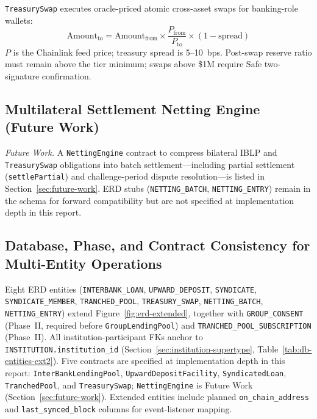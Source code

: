 \documentclass[12pt,a4paper]{report}
\begin{document}
\texttt{TreasurySwap} executes oracle-priced atomic cross-asset swaps for banking-role wallets:
\begin{equation}
\text{Amount}_{\text{to}} = \text{Amount}_{\text{from}} \times \frac{P_{\text{from}}}{P_{\text{to}}} \times (1 - \text{spread})
\end{equation}
\noindent $P$ is the Chainlink feed price; treasury spread is 5--10~bps. Post-swap reserve ratio must remain above the tier minimum; swaps above \$1M require Safe two-signature confirmation.

\subsection{Multilateral Settlement Netting Engine (Future Work)}
\label{sec:netting-settlement}

\noindent\textit{Future Work.} A \texttt{NettingEngine} contract to compress bilateral IBLP and \texttt{TreasurySwap} obligations into batch settlement---including partial settlement (\texttt{settlePartial}) and challenge-period dispute resolution---is listed in Section~\ref{sec:future-work}. ERD stubs (\texttt{NETTING\_BATCH}, \texttt{NETTING\_ENTRY}) remain in the schema for forward compatibility but are not specified at implementation depth in this report.

\subsection{Database, Phase, and Contract Consistency for Multi-Entity Operations}
\label{sec:multi-entity-consistency}

Eight ERD entities (\texttt{INTERBANK\_LOAN}, \texttt{UPWARD\_DEPOSIT}, \texttt{SYNDICATE}, \texttt{SYNDICATE\_MEMBER}, \texttt{TRANCHED\_POOL}, \texttt{TREASURY\_SWAP}, \texttt{NETTING\_BATCH}, \texttt{NETTING\_ENTRY}) extend Figure~\ref{fig:erd-extended}, together with \texttt{GROUP\_CONSENT} (Phase~II, required before \texttt{GroupLendingPool}) and \texttt{TRANCHED\_POOL\_SUBSCRIPTION} (Phase~II). All institution-participant FKs anchor to \texttt{INSTITUTION.institution\_id} (Section~\ref{sec:institution-supertype}, Table~\ref{tab:db-entities-ext2}). Five contracts are specified at implementation depth in this report: \texttt{InterBankLendingPool}, \texttt{UpwardDepositFacility}, \texttt{SyndicatedLoan}, \texttt{TranchedPool}, and \texttt{TreasurySwap}; \texttt{NettingEngine} is Future Work (Section~\ref{sec:future-work}). Extended entities include planned \texttt{on\_chain\_address} and \texttt{last\_synced\_block} columns for event-listener mapping.
\end{document}
